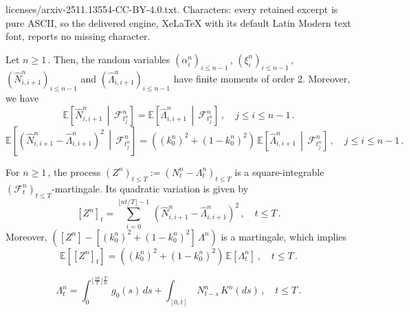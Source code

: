\documentclass[10pt,a4paper]{amsart}
\begin{document}
licenses/arxiv-2511.13554-CC-BY-4.0.txt. Characters: every retained excerpt is pure ASCII, so the delivered engine, XeLaTeX with its default Latin Modern text font, reports no missing character.
\begin{lemma}    
\label{lemma:estimates_random_variables}
Let $n \geq 1\,$. Then, the random variables $\left(\alpha^n_i\right)_{i \leq n-1}\,$, $\left(\xi^n_i\right)_{i \leq n-1}\,$, $\left(\widehat N^n_{i,i+1}\right)_{i \leq n-1}$ and $\left(\widehat \Lambda^n_{i,i+1}\right)_{i \leq n-1}$ have finite moments of order 2. Moreover, we have
    \begin{equation}
    \label{eq:exp_N_hat}
    \mathbb E \left[\widehat N^n_{i,i+1}\,\middle|\,\mathcal F^n_{t^n_j} \right] =  \mathbb E \left[\widehat \Lambda^n_{i,i+1} \,\middle|\,\mathcal F^n_{t^n_j}\right]\,, \quad j \leq i\leq n-1\,.
    \end{equation}
    \begin{equation}
        \label{eq:exp_Z_hat_squared}
        \mathbb E \left[\left(\widehat N^n_{i,i+1} - \widehat \Lambda^n_{i,i+1}\right)^2\,\middle|\,\mathcal F^n_{t^n_j} \right] = \left(\left(k_0^n\right)^2 + \left(1 - k_0^n\right)^2\right)\, \mathbb E \left[ \widehat \Lambda^n_{i,i+1}\,\middle|\,\mathcal F^n_{t^n_j} \right]\,, \quad j \leq  i \leq n-1\,.
    \end{equation}
\end{lemma}

\begin{lemma}
    \label{lemma:martingales}
    For $n \geq 1\,$, the process $\left(Z^n\right)_{t \leq T} := \left(N^n_t - \Lambda^n_t\right)_{t \leq T}$ is a square-integrable $\left(\mathcal F^n_t\right)_{t \leq T}$-martingale. Its quadratic variation is given by
    $$
    \left[ Z^n\right]_t = \sum_{i = 0}^{\lfloor nt/T\rfloor - 1}\,\left( \widehat N^n_{i,i+1} - \widehat \Lambda^n_{i,i+1}\right)^2\,, \quad t \leq T\,.
    $$
    Moreover, $\left([Z^n] - \left[\left(k_0^n\right)^2 + \left(1 - k_0^n\right)^2\right]\, \Lambda^n\right)$ is a martingale, which implies
    \begin{equation}
        \label{eq:exp_quadratic_var_Z}
        \mathbb E \left[\left[Z^n\right]_t \right] = \left(\left(k_0^n\right)^2 + \left(1 - k_0^n\right)^2\right)\, \mathbb E \left[ \Lambda^n_t\right]\,, \quad t \leq T\,.
    \end{equation}
\end{lemma}

    \begin{equation}
    \label{eq:volterra_equation}
    \Lambda^n_t = \int_0^{\lfloor \frac{nt}{T}\rfloor \frac{T}{n}}\,g_0(s)\,ds + \int_{[0,t]}\, N^n_{t-s}\,K^n(ds)\,, \quad t \leq T\,.
    \end{equation}
\end{document}
